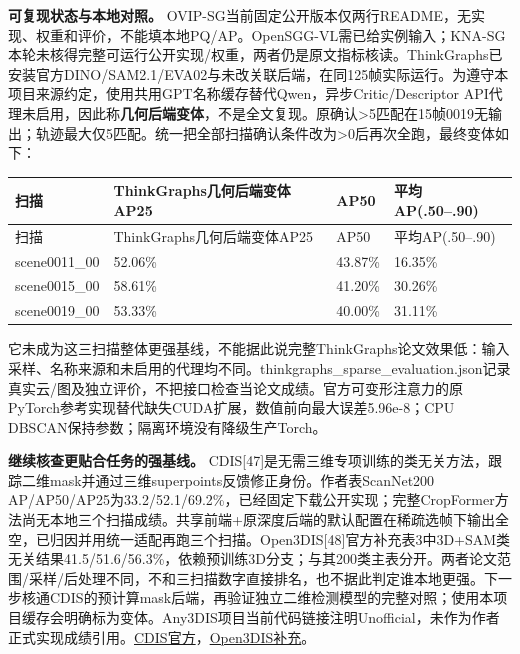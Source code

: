 \documentclass[UTF8,fontset=fandol]{ctexart}
\begin{document}
\textbf{可复现状态与本地对照。} OVIP-SG当前固定公开版本仅两行README，无实现、权重和评价，不能填本地PQ/AP。OpenSGG-VL需已给实例输入；KNA-SG本轮未核得完整可运行公开实现/权重，两者仍是原文指标核读。ThinkGraphs已安装官方DINO/SAM2.1/EVA02与未改关联后端，在同125帧实际运行。为遵守本项目来源约定，使用共用GPT名称缓存替代Qwen，异步Critic/Descriptor API代理未启用，因此称\textbf{几何后端变体}，不是全文复现。原确认>5匹配在15帧0019无输出；轨迹最大仅5匹配。统一把全部扫描确认条件改为>0后再次全跑，最终变体如下：



{\small
\begin{longtable}{|p{}|p{}|p{}|p{}|}
\hline
扫描 & ThinkGraphs几何后端变体AP25 & AP50 & 平均AP(.50–.90) \\ \hline
\endfirsthead
\hline
扫描 & ThinkGraphs几何后端变体AP25 & AP50 & 平均AP(.50–.90) \\ \hline
\endhead
scene0011\_00 & 52.06\% & 43.87\% & 16.35\% \\ \hline
scene0015\_00 & 58.61\% & 41.20\% & 30.26\% \\ \hline
scene0019\_00 & 53.33\% & 40.00\% & 31.11\% \\ \hline
\end{longtable}
}

它未成为这三扫描整体更强基线，不能据此说完整ThinkGraphs论文效果低：输入采样、名称来源和未启用的代理均不同。thinkgraphs\_sparse\_evaluation.json记录真实云/图及独立评价，不把接口检查当论文成绩。官方可变形注意力的原PyTorch参考实现替代缺失CUDA扩展，数值前向最大误差5.96e-8；CPU DBSCAN保持参数；隔离环境没有降级生产Torch。



\textbf{继续核查更贴合任务的强基线。} CDIS[47]是无需三维专项训练的类无关方法，跟踪二维mask并通过三维superpoints反馈修正身份。作者表ScanNet200 AP/AP50/AP25为33.2/52.1/69.2\%，已经固定下载公开实现；完整CropFormer方法尚无本地三个扫描成绩。共享前端+原深度后端的默认配置在稀疏选帧下输出全空，已归因并用统一适配再跑三个扫描。Open3DIS[48]官方补充表3中3D+SAM类无关结果41.5/51.6/56.3\%，依赖预训练3D分支；与其200类主表分开。两者论文范围/采样/后处理不同，不和三扫描数字直接排名，也不据此判定谁本地更强。下一步核通CDIS的预计算mask后端，再验证独立二维检测模型的完整对照；使用本项目缓存会明确标为变体。Any3DIS项目当前代码链接注明Unofficial，未作为作者正式实现成绩引用。\href{https://teamrobi.github.io/projects/cdis/}{CDIS官方}，\href{https://open3dis.github.io/assets/Open3DIS\_supplementary.pdf}{Open3DIS补充}。
\end{document}
